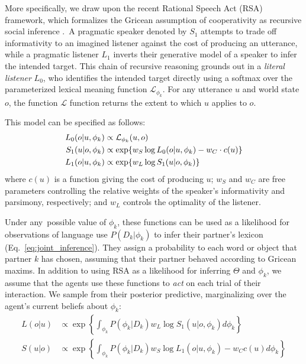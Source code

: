 More specifically, we draw upon the recent Rational Speech Act (RSA) framework, which formalizes the Gricean assumption of cooperativity as recursive social inference \cite{frank_predicting_2012,goodman_pragmatic_2016,FrankeJager16_ProbabilisticPragmatics}.~A pragmatic speaker denoted by $S_1$ attempts to trade off informativity to an imagined listener against the cost of producing an utterance, while a pragmatic listener $L_1$ inverts their generative model of a speaker to infer the intended target.
This chain of recursive reasoning grounds out in a \emph{literal listener} $L_0$, who identifies the intended target directly using a softmax over the parameterized lexical meaning function $\mathcal{L}_{\phi_k}$.
For any utterance $u$ and world state $o$, the function $\mathcal{L}$ function returns the extent to which $u$ applies to $o$.

This model can be specified as follows:
\begin{align}
L_0(o | u, \phi_k) &\propto  \mathcal{L}_{\phi_k}(u,o)\hfill\label{eq:RSA}\\
S_1(u | o, \phi_k) &\propto   \exp\{w_S \log L_0(o | u, \phi_k) - w_C \cdot c(u)\}\nonumber   \\
L_1(o | u, \phi_k) &\propto   \exp\{w_L \log S_1(u | o, \phi_k)\}\nonumber
\end{align}
where $c(u)$ is a function giving the cost of producing $u$; $w_S$ and $w_C$ are free parameters controlling the relative weights of the speaker's informativity and parsimony, respectively; and $w_L$ controls the optimality of the listener.

Under any possible value of $\phi_k$, these functions can be used as a likelihood for observations of language use $P(D_k | \phi_k)$ to infer their partner's lexicon (Eq.~\ref{eq:joint_inference}).
They assign a probability to each word or object that partner $k$ has chosen, assuming that their partner behaved according to Gricean maxims.
In addition to using RSA as a likelihood for inferring $\Theta$ and $\phi_k$, we assume that the agents use these functions to \emph{act} on each trial of their interaction.
We sample from their posterior predictive, marginalizing over the agent's current beliefs about $\phi_k$:
\begin{align}
L(o|u) &\propto   \exp\left\{ \textstyle{\int_{\phi_k}} P(\phi_k | D_k) w_L \log S_1(u|o, \phi_k)d\phi_k\right\}\label{eq:marginalized}\\
S(u|o) &\propto  \exp\left\{ \textstyle{\int_{\phi_k}} P(\phi_k | D_k)  w_S \log L_1(o| u, \phi_k) - w_C c(u)d\phi_k\right\}\nonumber
\end{align}

